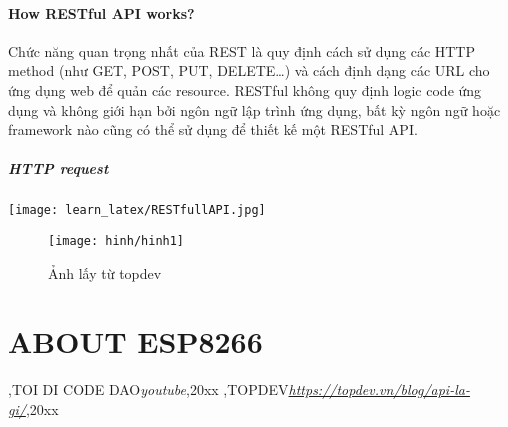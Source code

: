 \documentclass[class]{article}
\begin{document}
\subsection{ How RESTful API works?}
Chức năng quan trọng nhất của REST là quy định cách sử dụng các HTTP method (như GET, POST, PUT, DELETE…) và cách định dạng các URL cho ứng dụng web để quản các resource. RESTful không quy định logic code ứng dụng và không giới hạn bởi ngôn ngữ lập trình ứng dụng, bất kỳ ngôn ngữ hoặc framework nào cũng có thể sử dụng để thiết kế một RESTful API. \\
\subsubsection{HTTP request}
\texttt{[image: learn\_latex/RESTfullAPI.jpg]}
\begin{center}
    \begin{figure}[htp]
    \begin{center}
     \texttt{[image: hinh/hinh1]}
    \end{center}
    \caption{Ảnh lấy từ topdev}
    \label{refhinh1}
    \end{figure}
\end{center}

\part{\LARGE ABOUT ESP8266}
\begin{thebibliography}{5}
,TOI DI CODE DAO\textit{youtube},20xx
,TOPDEV\textit{\url{https://topdev.vn/blog/api-la-gi/}},20xx
\end{thebibliography}
\end{document}
